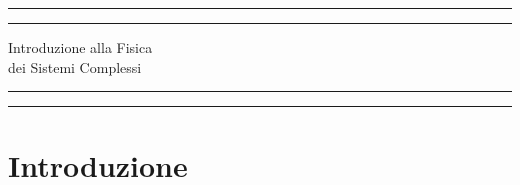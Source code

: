 \documentclass[12pt, a4paper]{book}
\theoremstyle{theorem}
\begin{document}
	\begin{titlepage}
		\centering %
		\scshape %
		\vspace*{1.5\baselineskip} %
		
		
		
		\rule{13cm}{1.6pt}\vspace*{-\baselineskip}\vspace*{2pt} %
		\rule{13cm}{0.4pt} %
		
		\vspace{0.75\baselineskip} %
		{ \Huge Introduzione alla Fisica\\
		\vspace{4mm}
		dei Sistemi Complessi \\ }
		\vspace{0.75\baselineskip} %
		\rule{13cm}{0.4pt}\vspace*{-\baselineskip}\vspace{3.2pt} %
		\rule{13cm}{1.6pt} %
		
		\vspace{1.75\baselineskip} %
		{}
		\vfill
	\end{titlepage}
	\tableofcontents
	\chapter{Introduzione} %
\end{document}
